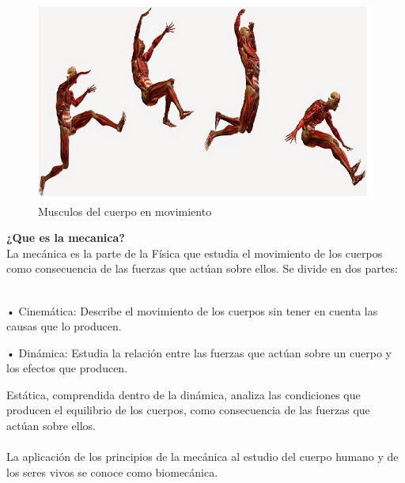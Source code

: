 \documentclass{article}
\begin{document}
\begin{figure} [htp]%
    \centering
    \includegraphics[width=150mm]{biomecanica1.jpg} %
    \caption{Musculos del cuerpo en movimiento}
    \label{grafica}
\end{figure}


\textbf{¿Que es la mecanica?} \\
La mecánica es la parte de la Física que estudia el movimiento de los cuerpos como consecuencia de las fuerzas que actúan sobre ellos.
Se divide en dos partes: \\
 \\

\begin{description}
\item •	Cinemática: Describe el movimiento de los cuerpos sin tener en cuenta las causas que lo producen.
\item •	Dinámica: Estudia la relación entre las fuerzas que actúan sobre un cuerpo y los efectos que producen.

\item Estática, comprendida dentro de la dinámica, analiza las condiciones que producen el equilibrio de los cuerpos, como consecuencia de las fuerzas que actúan sobre ellos.\\
\\
La aplicación de los principios de la mecánica al estudio del cuerpo humano y de los seres vivos se conoce como biomecánica.\\
\\
\end{description} 
\end{document}
